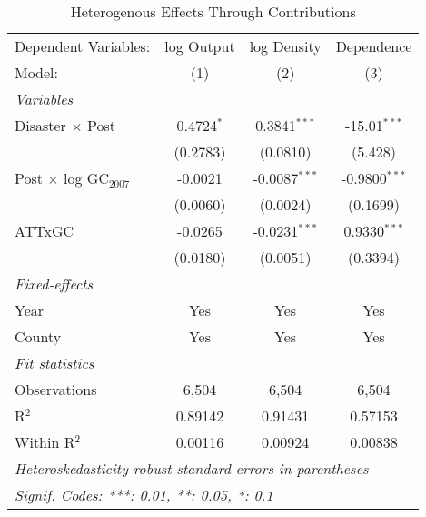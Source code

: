 
\begin{table}[htbp]
   \caption{Heterogenous Effects Through Contributions}
   \centering
   \begin{adjustbox}{max width = \textwidth, center}
      \begin{tabular}{lccc}
         \tabularnewline \midrule \midrule
         Dependent Variables:           & log Output   & log Density     & Dependence\\  
         Model:                         & (1)          & (2)             & (3)\\  
         \midrule
         \emph{Variables}\\
         Disaster $\times$ Post         & 0.4724$^{*}$ & 0.3841$^{***}$  & -15.01$^{***}$\\   
                                        & (0.2783)     & (0.0810)        & (5.428)\\   
         Post $\times$ log GC$_{2007}$  & -0.0021      & -0.0087$^{***}$ & -0.9800$^{***}$\\   
                                        & (0.0060)     & (0.0024)        & (0.1699)\\   
         ATTxGC                         & -0.0265      & -0.0231$^{***}$ & 0.9330$^{***}$\\   
                                        & (0.0180)     & (0.0051)        & (0.3394)\\   
         \midrule
         \emph{Fixed-effects}\\
         Year                           & Yes          & Yes             & Yes\\  
         County                         & Yes          & Yes             & Yes\\  
         \midrule
         \emph{Fit statistics}\\
         Observations                   & 6,504        & 6,504           & 6,504\\  
         R$^2$                          & 0.89142      & 0.91431         & 0.57153\\  
         Within R$^2$                   & 0.00116      & 0.00924         & 0.00838\\  
         \midrule \midrule
         \multicolumn{4}{l}{\emph{Heteroskedasticity-robust standard-errors in parentheses}}\\
         \multicolumn{4}{l}{\emph{Signif. Codes: ***: 0.01, **: 0.05, *: 0.1}}\\
      \end{tabular}
   \end{adjustbox}
\end{table}


